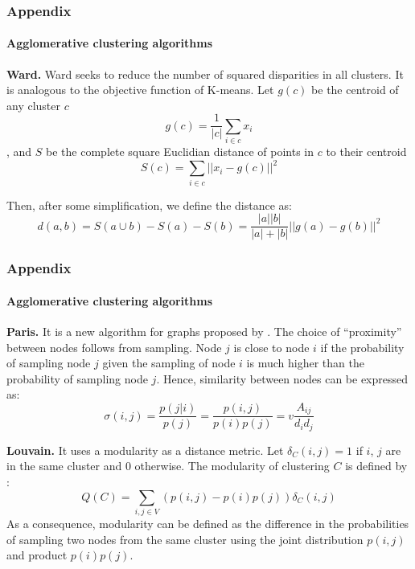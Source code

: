 \documentclass{tum-presentation}
\begin{document}
\begin{frame}
	\frametitle{Appendix}
	\framesubtitle{Agglomerative clustering algorithms}

	\textbf{Ward.}
	Ward seeks to reduce the number of squared disparities in all clusters. It is analogous to the objective function of K-means. Let $g(c)$ be the centroid of any cluster $c$ $$g(c)=\frac{1}{|c|}\sum_{i \in c}x_i$$, and $S$ be the complete square Euclidian distance of points in $c$ to their centroid $$ S(c) = \sum_{i \in c}||x_i - g(c) ||^2$$
	
	Then, after some simplification, we define the distance as: $$d(a,b)= S(a \cup b) - S(a) - S(b)=\frac{|a||b|}{|a|+|b|}||g(a)-g(b)||^2$$
	
\end{frame}


\begin{frame}
	\frametitle{Appendix}
	\framesubtitle{Agglomerative clustering algorithms}

	\textbf{Paris.}
	It is a new algorithm for graphs proposed by \cite{Bonald2018}. The choice of “proximity” between nodes follows from sampling. Node $j$ is close to node $i$ if the probability of sampling node $j$ given the sampling of node $i$ is much higher than the probability of sampling node $j$. Hence, similarity between nodes can be expressed as: $$\sigma(i,j)=\frac{p(j|i)}{p(j)}=\frac{p(i,j)}{p(i)p(j)}=v\frac{A_{ij}}{d_i d_j} $$
	
	
	\textbf{Louvain.}
	It uses a modularity as a distance metric. Let $\delta_{C}(i, j) = 1$ if $i$, $j$ are in the same cluster and 0 otherwise. The modularity of clustering $C$ is defined by \cite{Newman_2004}: $$Q(C)=\sum_{i,j \in V}(p(i,j)-p(i)p(j))\delta_{C}(i, j)$$ As a consequence, modularity can be defined as the difference in the probabilities of sampling two nodes from the same cluster using the joint distribution $p(i, j)$ and product $p(i)p(j)$. 
	
\end{frame}
\end{document}
